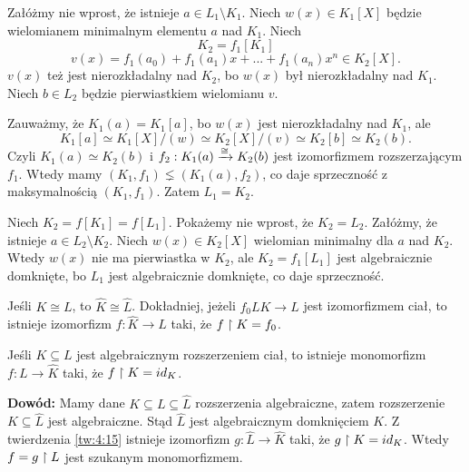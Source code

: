 Załóżmy nie wprost, że istnieje $a\in L_1\setminus K_1$. Niech $w(x)\in K_1[X]$ będzie wielomianem minimalnym elementu $a$ nad $K_1$. Niech
$$K_2=f_1[K_1]$$
$$v(x)=f_1(a_0)+f_1(a_1)x+...+f_1(a_n)x^n\in K_2[X].$$
$v(x)$ też jest nierozkładalny nad $K_2$, bo $w(x)$ był nierozkładalny nad $K_1$. Niech $b\in L_2$ będzie pierwiastkiem wielomianu $v$.

Zauważmy, że $K_1(a)=K_1[a]$, bo $w(x)$ jest nierozkładalny nad $K_1$, ale
$$K_1[a]\simeq K_1[X]/(w)\simeq K_2[X]/(v)\simeq K_2[b]\simeq K_2(b).$$
Czyli $K_1(a)\simeq K_2(b)$ i $f_2:K_1(a)\xrightarrow[]{\cong}K_2(b)$ jest izomorfizmem rozszerzającym $f_1$. Wtedy mamy $(K_1,f_1)\lneq(K_1(a),f_2)$, co daje sprzeczność z maksymalnością $(K_1,f_1)$. Zatem $L_1=K_2$.

Niech $K_2=f[K_1]=f[L_1]$. Pokażemy nie wprost, że $K_2=L_2$. Załóżmy, że istnieje $a\in L_2\setminus K_2$. Niech $w(x)\in K_2[X]$ wielomian minimalny dla $a$ nad $K_2$. Wtedy $w(x)$ nie ma pierwiastka w $K_2$, ale $K_2=f_1[L_1]$ jest algebraicznie domknięte, bo $L_1$ jest algebraicznie domknięte, co daje sprzeczność.

\begin{wniosek}
    Jeśli $K\cong L$, to $\hat{K}\cong \hat{L}$. Dokładniej, jeżeli $f_0LK\to L$ jest izomorfizmem ciał, to istnieje izomorfizm $f:\hat{K}\to\hat{L}$ taki, że $f\upharpoonright K=f_0$.
\end{wniosek}

\begin{wniosek}
    Jeśli $K\subseteq L$ jest algebraicznym rozszerzeniem ciał, to istnieje monomorfizm $f:L\to \hat{K}$ taki, że $f\upharpoonright K=id_K$.
\end{wniosek}

\textbf{Dowód:} Mamy dane $K\subseteq L\subseteq\hat{L}$ rozszerzenia algebraiczne, zatem rozszerzenie $K\subseteq\hat{L}$ jest algebraiczne. Stąd $\hat{L}$ jest algebraicznym domknięciem $K$. Z twierdzenia \ref{tw:4:15} istnieje izomorfizm $g:\hat{L}\to\hat{K}$ taki, że $g\upharpoonright K=id_K$. Wtedy $f=g\upharpoonright L$ jest szukanym monomorfizmem.